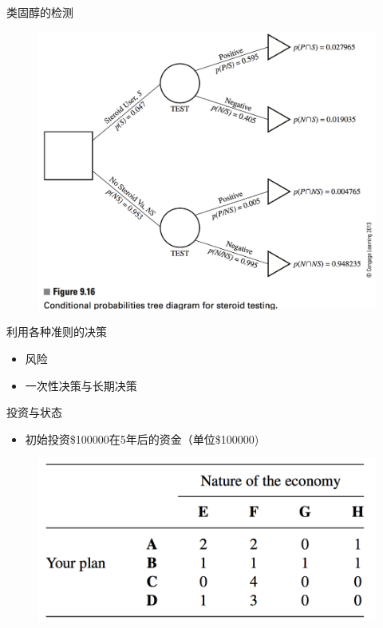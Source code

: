 \documentclass[UTF8]{ctexbeamer}
\begin{document}
\begin{frame}{类固醇的检测}
  
  \begin{figure}
    \includegraphics[width=0.8\textwidth{}]{9_16.png}
  \end{figure}

\end{frame}

\begin{frame}{利用各种准则的决策}

  \begin{itemize}
  \item 风险
  \item 一次性决策与长期决策
  \end{itemize}
  
\end{frame}

\begin{frame}{投资与状态}

  \begin{itemize}
  \item 初始投资\$100000在5年后的资金（单位\$100000)
  \end{itemize}
  
  \begin{figure}
    \includegraphics[width=0.8\textwidth{}]{plan.png}
  \end{figure}

\end{frame}
\end{document}
